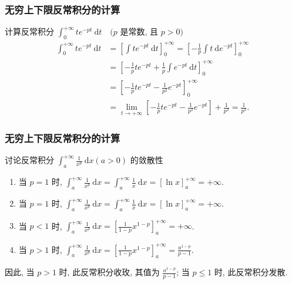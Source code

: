 \documentclass[
10pt,
aspectratio=43,
]{beamer}
\begin{document}
\begin{frame}
	\frametitle{无穷上下限反常积分的计算}
	\everymath{\displaystyle}
	\begin{block}{计算反常积分 $\int_0^{+\infty} t e^{-p t} \mathrm{~d} t \quad(p$ 是常数, 且 $p>0)$}
		$$
			\begin{aligned}
				\int_0^{+\infty} t e^{-p t} \mathrm{~d}t & =\left[\int t e^{-p t} \mathrm{~d}t\right]_0^{+\infty}=\left[-\frac{1}{p} \int t \mathrm{~d} e^{-p t}\right]_0^{+\infty} \\
				                                         & =\left[-\frac{1}{p} t e^{-p t}+\frac{1}{p} \int e^{-p t} \mathrm{~d}t\right]_0^{+\infty}                                 \\
				                                         & =\left[-\frac{1}{p} t e^{-p t}-\frac{1}{p^2} e^{-p t}\right]_0^{+\infty}                                                 \\
				                                         & =\lim _{t \rightarrow+\infty}\left[-\frac{1}{p} t e^{-p t}-\frac{1}{p^2} e^{-p t}\right]+\frac{1}{p^2}=\frac{1}{p^2} .
			\end{aligned}
		$$
	\end{block}
\end{frame}

\begin{frame}
	\frametitle{无穷上下限反常积分的计算}
	\everymath{\displaystyle}
	\begin{block}{讨论反常积分 $\int_a^{+\infty} \frac{1}{x^p} \mathrm{~d}x(a>0)$ 的敛散性}
		\begin{enumerate}
			\item 当 $p=1$ 时, $\int_a^{+\infty} \frac{1}{x^p} \mathrm{~d}x=\int_a^{+\infty} \frac{1}{x} \mathrm{~d}x=[\ln x]_a^{+\infty}=+\infty$.
			\item 当 $p=1$ 时, $\int_a^{+\infty} \frac{1}{x^p} \mathrm{~d}x=\int_a^{+\infty} \frac{1}{x} \mathrm{~d}x=[\ln x]_a^{+\infty}=+\infty$.
			\item 当 $p<1$ 时, $\int_a^{+\infty} \frac{1}{x^p} \mathrm{~d}x=\left[\frac{1}{1-p} x^{1-p}\right]_a^{+\infty}=+\infty$.
			\item 当 $p>1$ 时, $\int_a^{+\infty} \frac{1}{x^p} \mathrm{~d}x=\left[\frac{1}{1-p} x^{1-p}\right]_a^{+\infty}=\frac{a^{1-p}}{p-1}$.
		\end{enumerate}
		因此, 当 $p>1$ 时, 此反常积分收玫, 其值为 $\frac{a^{1-p}}{p-1}$; 当 $p \leq 1$ 时, 此反常积分发散.
	\end{block}
\end{frame}
\end{document}
